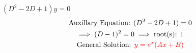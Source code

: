 \item [5.] $(D^2-2D+1)y=0$
\begin{gather*}
    \text{Auxillary Equation: }(D^2-2D+1)=0\\
    \implies (D-1)^2=0 \implies \text{root(s): } 1\\
    \text{General Solution: } \textcolor{red}{y=e^{x}(Ax+B)}
\end{gather*}